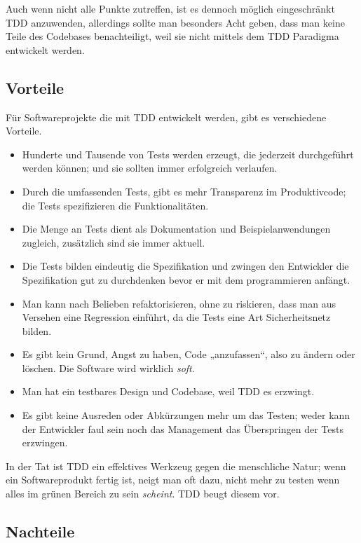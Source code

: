 \documentclass[a4paper,10pt]{scrartcl}
\begin{document}
Auch wenn nicht alle Punkte zutreffen, ist es dennoch möglich eingeschränkt TDD
anzuwenden, allerdings sollte man besonders Acht geben, dass man keine Teile
des Codebases benachteiligt, weil sie nicht mittels dem TDD Paradigma
entwickelt werden.

\subsection{Vorteile}

Für Softwareprojekte die mit TDD entwickelt werden, gibt es verschiedene
Vorteile.

\begin{itemize}
    \item Hunderte und Tausende von Tests werden erzeugt, die jederzeit
        durchgeführt werden können; und sie sollten immer erfolgreich
        verlaufen.
    \item Durch die umfassenden Tests, gibt es mehr Transparenz im
        Produktivcode; die Tests spezifizieren die Funktionalitäten.
    \item Die Menge an Tests dient als Dokumentation und Beispielanwendungen
        zugleich, zusätzlich sind sie immer aktuell.
    \item Die Tests bilden eindeutig die Spezifikation und zwingen den
        Entwickler die Spezifikation gut zu durchdenken bevor er mit dem
        programmieren anfängt.
    \item Man kann nach Belieben refaktorisieren, ohne zu riskieren, dass man
        aus Versehen eine Regression einführt, da die Tests eine Art
        Sicherheitsnetz bilden.
    \item Es gibt kein Grund, Angst zu haben, Code „anzufassen“, also zu ändern
        oder löschen. Die Software wird wirklich \emph{soft}. \cite{UncleBob}
    \item Man hat ein testbares Design und Codebase, weil TDD es erzwingt.
    \item Es gibt keine Ausreden oder Abkürzungen mehr um das Testen; weder
        kann der Entwickler faul sein noch das Management das Überspringen der
        Tests erzwingen.
\end{itemize}

In der Tat ist TDD ein effektives Werkzeug gegen die menschliche Natur; wenn
ein Softwareprodukt fertig ist, neigt man oft dazu, nicht mehr zu testen wenn
alles im grünen Bereich zu sein \emph{scheint}. TDD beugt diesem vor.

\subsection{Nachteile}
\end{document}

